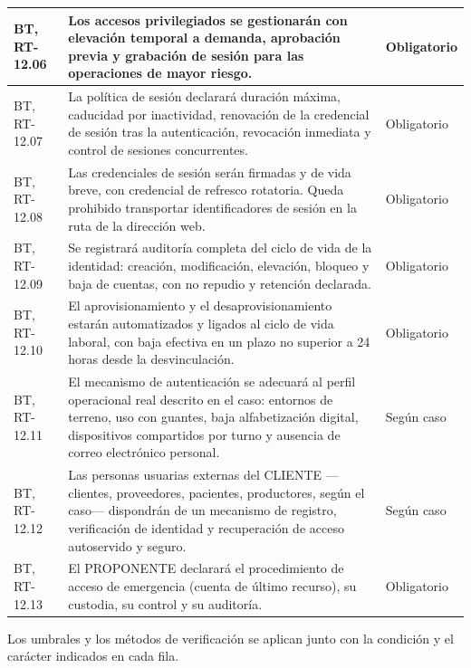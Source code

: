 \begin{longtable}{|L{0.098425\AnchoTablaAnexo}|L{0.814961\AnchoTablaAnexo}|L{0.086614\AnchoTablaAnexo}|}
BT, RT-12.06 &
Los accesos privilegiados se gestionarán con elevación temporal a demanda, aprobación previa y grabación de sesión para las operaciones de mayor riesgo. &
Obligatorio \\ \hline
{}
BT, RT-12.07 &
La política de sesión declarará duración máxima, caducidad por inactividad, renovación de la credencial de sesión tras la autenticación, revocación inmediata y control de sesiones concurrentes. &
Obligatorio \\ \hline
BT, RT-12.08 &
Las credenciales de sesión serán firmadas y de vida breve, con credencial de refresco rotatoria. Queda prohibido transportar identificadores de sesión en la ruta de la dirección web. &
Obligatorio \\ \hline
{}
BT, RT-12.09 &
Se registrará auditoría completa del ciclo de vida de la identidad: creación, modificación, elevación, bloqueo y baja de cuentas, con no repudio y retención declarada. &
Obligatorio \\ \hline
BT, RT-12.10 &
El aprovisionamiento y el desaprovisionamiento estarán automatizados y ligados al ciclo de vida laboral, con baja efectiva en un plazo no superior a 24 horas desde la desvinculación. &
Obligatorio \\ \hline
{}
BT, RT-12.11 &
El mecanismo de autenticación se adecuará al perfil operacional real descrito en el caso: entornos de terreno, uso con guantes, baja alfabetización digital, dispositivos compartidos por turno y ausencia de correo electrónico personal. &
Según caso \\ \hline
BT, RT-12.12 &
Las personas usuarias externas del CLIENTE —clientes, proveedores, pacientes, productores, según el caso— dispondrán de un mecanismo de registro, verificación de identidad y recuperación de acceso autoservido y seguro. &
Según caso \\ \hline
{}
BT, RT-12.13 &
El PROPONENTE declarará el procedimiento de acceso de emergencia (cuenta de último recurso), su custodia, su control y su auditoría. &
Obligatorio \\ \hline
\end{longtable}

Los umbrales y los métodos de verificación se aplican junto con la condición y el carácter indicados en cada fila.
